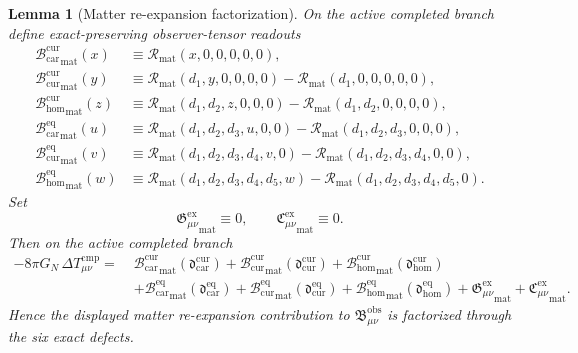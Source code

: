 \documentclass[11pt]{article}
\newcommand{\DeltaTComp}{\Delta T_{\mu\nu}^{\mathrm{cmp}}}
\newcommand{\ObsBurden}{\mathfrak B_{\mu\nu}^{\mathrm{obs}}}
\newcommand{\GaugeExact}{\mathfrak G_{\mu\nu}^{\mathrm{ex}}}
\newcommand{\ConstraintExact}{\mathfrak C_{\mu\nu}^{\mathrm{ex}}}
\newcommand{\TensorCurrentBridge}{\mathcal B_{\mathrm{car}}^{\mathrm{cur}}}
\newcommand{\CurCurrentBridge}{\mathcal B_{\mathrm{cur}}^{\mathrm{cur}}}
\newcommand{\HomCurrentBridge}{\mathcal B_{\mathrm{hom}}^{\mathrm{cur}}}
\newcommand{\TensorEqBridge}{\mathcal B_{\mathrm{car}}^{\mathrm{eq}}}
\newcommand{\CurEqBridge}{\mathcal B_{\mathrm{cur}}^{\mathrm{eq}}}
\newcommand{\HomEqBridge}{\mathcal B_{\mathrm{hom}}^{\mathrm{eq}}}
\newcommand{\MatterRead}{\mathscr R_{\mathrm{mat}}}
\newtheorem{lemma}{Lemma}
\begin{document}
\begin{lemma}[Matter re-expansion factorization]
\label{lem:direct_matter}
On the active completed branch define exact-preserving observer-tensor readouts
\[
\begin{aligned}
{\TensorCurrentBridge}_{\mathrm{mat}}(x)
&\equiv
\MatterRead(x,0,0,0,0,0),
\\
{\CurCurrentBridge}_{\mathrm{mat}}(y)
&\equiv
\MatterRead(d_1,y,0,0,0,0)
-\MatterRead(d_1,0,0,0,0,0),
\\
{\HomCurrentBridge}_{\mathrm{mat}}(z)
&\equiv
\MatterRead(d_1,d_2,z,0,0,0)
-\MatterRead(d_1,d_2,0,0,0,0),
\\
{\TensorEqBridge}_{\mathrm{mat}}(u)
&\equiv
\MatterRead(d_1,d_2,d_3,u,0,0)
-\MatterRead(d_1,d_2,d_3,0,0,0),
\\
{\CurEqBridge}_{\mathrm{mat}}(v)
&\equiv
\MatterRead(d_1,d_2,d_3,d_4,v,0)
-\MatterRead(d_1,d_2,d_3,d_4,0,0),
\\
{\HomEqBridge}_{\mathrm{mat}}(w)
&\equiv
\MatterRead(d_1,d_2,d_3,d_4,d_5,w)
-\MatterRead(d_1,d_2,d_3,d_4,d_5,0).
\end{aligned}
\]
Set
\[
{\GaugeExact}_{\mathrm{mat}}\equiv 0,
\qquad
{\ConstraintExact}_{\mathrm{mat}}\equiv 0.
\]
Then on the active completed branch
\begin{equation}
\begin{aligned}
-8\pi G_N\,\DeltaTComp
=\;&
{\TensorCurrentBridge}_{\mathrm{mat}}\!\left(\mathfrak d_{\mathrm{car}}^{\mathrm{cur}}\right)
+{\CurCurrentBridge}_{\mathrm{mat}}\!\left(\mathfrak d_{\mathrm{cur}}^{\mathrm{cur}}\right)
+{\HomCurrentBridge}_{\mathrm{mat}}\!\left(\mathfrak d_{\mathrm{hom}}^{\mathrm{cur}}\right)
\\
&+{\TensorEqBridge}_{\mathrm{mat}}\!\left(\mathfrak d_{\mathrm{car}}^{\mathrm{eq}}\right)
+{\CurEqBridge}_{\mathrm{mat}}\!\left(\mathfrak d_{\mathrm{cur}}^{\mathrm{eq}}\right)
+{\HomEqBridge}_{\mathrm{mat}}\!\left(\mathfrak d_{\mathrm{hom}}^{\mathrm{eq}}\right)
+{\GaugeExact}_{\mathrm{mat}}+{\ConstraintExact}_{\mathrm{mat}}.
\end{aligned}
\label{eq:direct_bridge_matter}
\end{equation}
Hence the displayed matter re-expansion contribution to \(\ObsBurden\) is factorized through the six exact defects.
\end{lemma}
\end{document}
